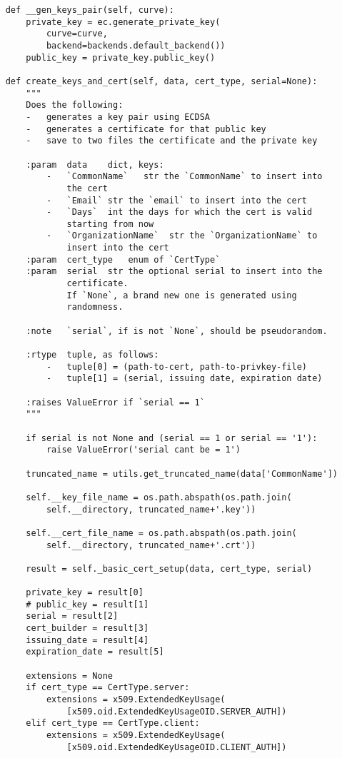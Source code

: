 \begin{verbatim}
    def __gen_keys_pair(self, curve):
        private_key = ec.generate_private_key(
            curve=curve,
            backend=backends.default_backend())
        public_key = private_key.public_key()

    def create_keys_and_cert(self, data, cert_type, serial=None):
        """
        Does the following:
        -   generates a key pair using ECDSA
        -   generates a certificate for that public key
        -   save to two files the certificate and the private key

        :param  data    dict, keys:
            -   `CommonName`   str the `CommonName` to insert into
                the cert
            -   `Email` str the `email` to insert into the cert
            -   `Days`  int the days for which the cert is valid
                starting from now
            -   `OrganizationName`  str the `OrganizationName` to
                insert into the cert
        :param  cert_type   enum of `CertType`
        :param  serial  str the optional serial to insert into the
                certificate.
                If `None`, a brand new one is generated using
                randomness.

        :note   `serial`, if is not `None`, should be pseudorandom.

        :rtype  tuple, as follows:
            -   tuple[0] = (path-to-cert, path-to-privkey-file)
            -   tuple[1] = (serial, issuing date, expiration date)

        :raises ValueError if `serial == 1`
        """

        if serial is not None and (serial == 1 or serial == '1'):
            raise ValueError('serial cant be = 1')

        truncated_name = utils.get_truncated_name(data['CommonName'])

        self.__key_file_name = os.path.abspath(os.path.join(
            self.__directory, truncated_name+'.key'))

        self.__cert_file_name = os.path.abspath(os.path.join(
            self.__directory, truncated_name+'.crt'))

        result = self._basic_cert_setup(data, cert_type, serial)

        private_key = result[0]
        # public_key = result[1]
        serial = result[2]
        cert_builder = result[3]
        issuing_date = result[4]
        expiration_date = result[5]

        extensions = None
        if cert_type == CertType.server:
            extensions = x509.ExtendedKeyUsage(
                [x509.oid.ExtendedKeyUsageOID.SERVER_AUTH])
        elif cert_type == CertType.client:
            extensions = x509.ExtendedKeyUsage(
                [x509.oid.ExtendedKeyUsageOID.CLIENT_AUTH])


\end{verbatim}
